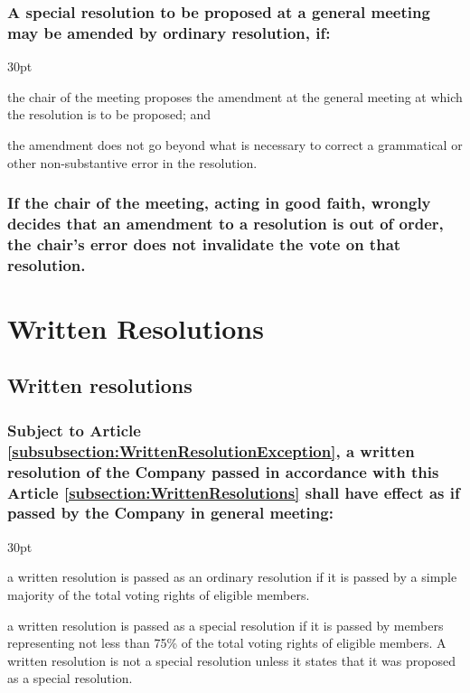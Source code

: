 \documentclass[12pt]{article}
\def\clauseindent{30pt}
\newenvironment{subindentpara}{\begin{adjustwidth}{\clauseindent}{}\begin{hanginglist}}{\end{hanginglist}\end{adjustwidth}}
\begin{document}
\subsubsection{A special resolution to be proposed at a general meeting may be amended by ordinary resolution, if:}
\begin{subindentpara}
    \item the chair of the meeting proposes the amendment at the general meeting at which the resolution is to be proposed; and
    \item the amendment does not go beyond what is necessary to correct a grammatical or other non-substantive error in the resolution.
\end{subindentpara}
\subsubsection{If the chair of the meeting, acting in good faith, wrongly decides that an amendment to a resolution is out of order, the chair's error does not invalidate the vote on that resolution.}

\section*{Written Resolutions}
\subsection{\label{subsection:WrittenResolutions}Written resolutions}
\subsubsection{Subject to Article \ref{subsubsection:WrittenResolutionException}, a written resolution of the Company passed in accordance with this Article \ref{subsection:WrittenResolutions} shall have effect as if passed by the Company in general meeting:}
\begin{subindentpara}
    \item a written resolution is passed as an ordinary resolution if it is passed by a simple majority of the total voting rights of eligible members.
    \item a written resolution is passed as a special resolution if it is passed by members representing not less than 75\% of the total voting rights of eligible members. A written resolution is not a special resolution unless it states that it was proposed as a special resolution.
\end{subindentpara}
\end{document}
